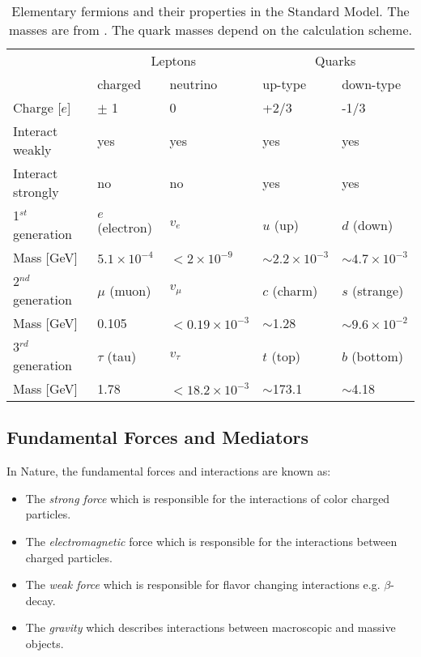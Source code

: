 \begin{table}[htb!]
  \centering
  \caption{Elementary fermions and their properties in the Standard Model. The masses are from \cite{Patrignani:2016xqp}. The quark masses depend on the calculation scheme.}
  \label{table:Fermions}
  \begin{tabular}{@{}lllll@{}} \toprule
    & \multicolumn{2}{c}{Leptons} & \multicolumn{2}{c}{Quarks} \\ \cmidrule(r){2-5}
    & charged & neutrino & up-type & down-type \\ \midrule
    Charge [$e$] & $\pm$ 1 & 0 & +2/3 & -1/3 \\
    Interact weakly & yes & yes & yes & yes \\
    Interact strongly & no & no & yes & yes \\ \midrule
    1$^{st}$ generation & $e$ (electron) & $v_e$ & $u$ (up) & $d$ (down) \\
    Mass [GeV] & $5.1 \times 10^{-4}$ & $< 2 \times 10^{-9}$ & $\sim 2.2 \times 10^{-3}$ & $\sim 4.7 \times 10^{-3}$\\ \midrule
    2$^{nd}$ generation & $\mu$ (muon) & $v_{\mu}$ & $c$ (charm) & $s$ (strange) \\
    Mass [GeV] & 0.105 & $< 0.19 \times 10^{-3}$ & $\sim$1.28 & $\sim 9.6 \times 10^{-2}$\\ \midrule
    3$^{rd}$ generation & $\tau$ (tau) & $v_{\tau}$ & $t$ (top) & $b$ (bottom) \\
    Mass [GeV] & 1.78 & $< 18.2 \times 10^{-3}$ & $\sim$173.1 & $\sim$4.18\\
    \bottomrule
  \end{tabular}
\end{table}

\subsection{Fundamental Forces and Mediators}
\label{subsec:Mediators}

In Nature, the fundamental forces and interactions are known as:
\begin{itemize}
  \item The \textit{strong force} which is responsible for the interactions of color charged particles.
  \item The \textit{electromagnetic} force which is responsible for the interactions between charged particles.
  \item The \textit{weak force} which is responsible for flavor changing interactions e.g. $\beta$-decay.
  \item The \textit{gravity} which describes interactions between macroscopic and massive objects.
\end{itemize}

